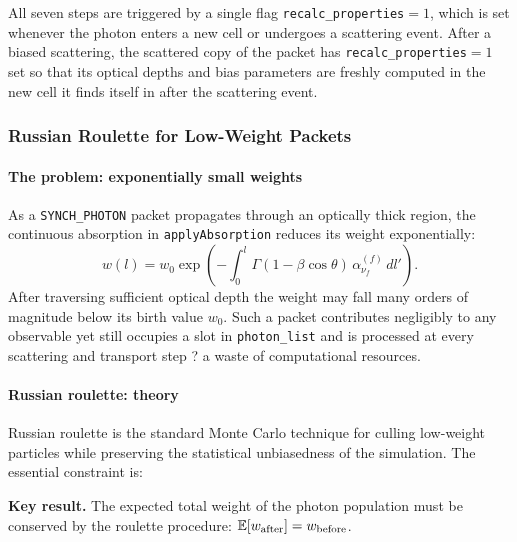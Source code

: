 \documentclass[12pt,a4paper]{article}
\newcommand{\nuf}{\nu_{\!f}}
\newcommand{\code}[1]{\texttt{#1}}
\newenvironment{keyresult}{%
	\begin{framed}\noindent\textbf{Key result.}\quad}
	{\end{framed}}
\begin{document}
All seven steps are triggered by a single flag
\code{recalc\_properties}$=1$, which is set whenever the photon enters
a new cell or undergoes a scattering event.  After a biased scattering,
the scattered copy of the packet has \code{recalc\_properties}$=1$ set
so that its optical depths and bias parameters are freshly computed in
the new cell it finds itself in after the scattering event.

\subsubsection{Russian Roulette for Low-Weight Packets}
\label{sec:roulette}

\paragraph{The problem: exponentially small weights}

As a \code{SYNCH\_PHOTON} packet propagates through an optically thick
region, the continuous absorption in \code{applyAbsorption} reduces its
weight exponentially:
\begin{equation}
	w(l) = w_0 \exp\!\left(-\int_0^l \Gamma(1-\beta\cos\theta)\,
	\alpha_{\nuf}^{(f)}\,dl'\right).
\end{equation}
After traversing sufficient optical depth the weight may fall many orders
of magnitude below its birth value $w_0$.  Such a packet contributes
negligibly to any observable yet still occupies a slot in
\code{photon\_list} and is processed at every scattering and transport
step ? a waste of computational resources.

\paragraph{Russian roulette: theory}

Russian roulette is the standard Monte Carlo technique for culling
low-weight particles while preserving the statistical unbiasedness of
the simulation.  The essential constraint is:

\begin{keyresult}
	The expected total weight of the photon population must be conserved by
	the roulette procedure: $\mathbb{E}[w_{\rm after}] = w_{\rm before}$.
\end{keyresult}
\end{document}
